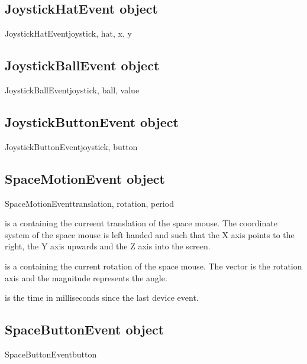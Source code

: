 \subsection{JoystickHatEvent object}

\begin{classdesc}{JoystickHatEvent}{joystick, hat, x, y}
\end{classdesc}


\subsection{JoystickBallEvent object}

\begin{classdesc}{JoystickBallEvent}{joystick, ball, value}
\end{classdesc}


\subsection{JoystickButtonEvent object}

\begin{classdesc}{JoystickButtonEvent}{joystick, button}
\end{classdesc}

\subsection{SpaceMotionEvent object}

\begin{classdesc}{SpaceMotionEvent}{translation, rotation, period}

 is a  containing the curreent translation of
the space mouse. The coordinate system of the space mouse is left
handed and such that the X axis points to the right, the Y axis
upwards and the Z axis into the screen.

 is a  containing the current rotation of the
space mouse. The vector is the rotation axis and the magnitude represents
the angle.

 is the time in milliseconds since the last device event.
\end{classdesc}

\subsection{SpaceButtonEvent object}

\begin{classdesc}{SpaceButtonEvent}{button}
\end{classdesc}

